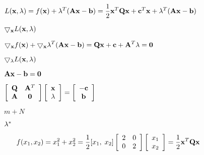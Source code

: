 \documentclass{article}
\def\lthtmlcheckvsize{\ifdim\ht\sizebox<\vsize 
  \ifdim\wd\sizebox<\hsize\expandafter\hfill\fi \expandafter\vfill
  \else\expandafter\vss\fi}%
\begin{document}
{\newpage\clearpage
{}%
$\displaystyle L({\bf x},{\bf\lambda})=f({\bf x})+{\bf\lambda}^T({\bf Ax}-{\bf b})
=\frac{1}{2}{\bf x}^T{\bf Q}{\bf x}+{\bf c}^T{\bf x}
+{\bf\lambda}^T({\bf Ax}-{\bf b})$%
\lthtmlindisplaymathZ
\lthtmlcheckvsize\clearpage}

{\newpage\clearpage
{}%
$\displaystyle \bigtriangledown_{\bf x}L({\bf x},{\bf\lambda})$%
\lthtmlindisplaymathZ
\lthtmlcheckvsize\clearpage}

{\newpage\clearpage
{}%
$\displaystyle \bigtriangledown_{\bf x}f({\bf x})
+\bigtriangledown_{\bf x}{\bf\lambda}^T({\bf A}{\bf x}-{\bf b})
={\bf Qx}+{\bf c}+{\bf A}^T{\bf\lambda}={\bf0}$%
\lthtmlindisplaymathZ
\lthtmlcheckvsize\clearpage}

{\newpage\clearpage
{}%
$\displaystyle \bigtriangledown_{\bf\lambda}L({\bf x},{\bf\lambda})$%
\lthtmlindisplaymathZ
\lthtmlcheckvsize\clearpage}

{\newpage\clearpage
{}%
$\displaystyle {\bf Ax}-{\bf b}={\bf0}$%
\lthtmlindisplaymathZ
\lthtmlcheckvsize\clearpage}

{\newpage\clearpage
{}%
$\displaystyle \left[\begin{array}{cc}{\bf Q}&{\bf A}^T\\{\bf A}&{\bf0}\end{array}\right]
\left[\begin{array}{c}{\bf x}\\{\bf\lambda}\end{array}\right]
=\left[\begin{array}{c}-{\bf c}\\{\bf b}\end{array}\right]$%
\lthtmlindisplaymathZ
\lthtmlcheckvsize\clearpage}

{\newpage\clearpage
{}%
$ m+N$%
\lthtmlindisplaymathZ
\lthtmlcheckvsize\clearpage}

{\newpage\clearpage
{}%
$ {\bf\lambda}^*$%
\lthtmlindisplaymathZ
\lthtmlcheckvsize\clearpage}

{\newpage\clearpage
{}%
$\displaystyle \;\;\;\;\;\;f(x_1,x_2)=x^2_1+x^2_2
=\frac{1}{2}[x_1,\;x_2]\left[\begin{array}{cc}2&0\\0&2\end{array}\right]
\left[\begin{array}{c}x_1\\x_2\end{array}\right]
=\frac{1}{2}{\bf x}^T{\bf Q}{\bf x}$%
\lthtmlindisplaymathZ
\lthtmlcheckvsize\clearpage}
\end{document}
